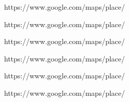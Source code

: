 https://www.google.com/maps/place/%

https://www.google.com/maps/place/%

https://www.google.com/maps/place/%

https://www.google.com/maps/place/%


https://www.google.com/maps/place/%

https://www.google.com/maps/place/%

